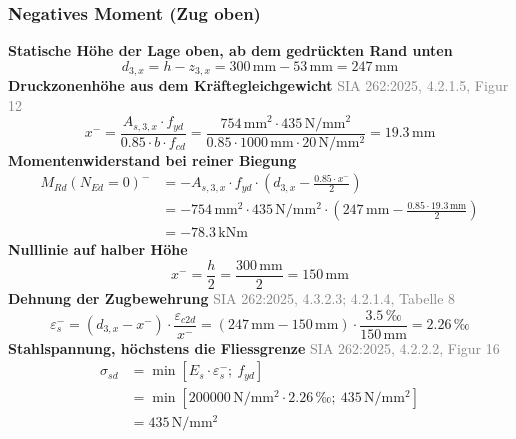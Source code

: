 \documentclass[11pt,a4paper]{article}
\newcommand{\normref}[1]{{\small\textcolor{gray}{#1}}}
\begin{document}
\subsubsection{Negatives Moment (Zug oben)}
\noindent\textbf{Statische Höhe der Lage oben, ab dem gedrückten Rand unten}
\begin{equation*}
d_{3,x} = h - z_{3,x} = 300\,\mathrm{mm} - 53\,\mathrm{mm} = 247\,\mathrm{mm}
\end{equation*}
\noindent\textbf{Druckzonenhöhe aus dem Kräftegleichgewicht} \hfill \normref{SIA 262:2025, 4.2.1.5, Figur 12}
\begin{equation*}
x^{-} = \frac{A_{s,3,x} \cdot f_{yd}}{0.85 \cdot b \cdot f_{cd}} = \frac{754\,\mathrm{mm}^{2} \cdot 435\,\mathrm{N}/\mathrm{mm}^{2}}{0.85 \cdot 1000\,\mathrm{mm} \cdot 20\,\mathrm{N}/\mathrm{mm}^{2}} = 19.3\,\mathrm{mm}
\end{equation*}
\noindent\textbf{Momentenwiderstand bei reiner Biegung}
\begin{equation*}
\begin{aligned}
  M_{Rd}(N_{Ed}=0)^{-} &= -A_{s,3,x} \cdot f_{yd} \cdot \left(d_{3,x} - \frac{0.85 \cdot x^{-}}{2}\right) \\
  &= -754\,\mathrm{mm}^{2} \cdot 435\,\mathrm{N}/\mathrm{mm}^{2} \cdot \left(247\,\mathrm{mm} - \frac{0.85 \cdot 19.3\,\mathrm{mm}}{2}\right) \\
  &= -78.3\,\mathrm{kNm}
\end{aligned}
\end{equation*}
\noindent\textbf{Nulllinie auf halber Höhe}
\begin{equation*}
x^{-} = \frac{h}{2} = \frac{300\,\mathrm{mm}}{2} = 150\,\mathrm{mm}
\end{equation*}
\noindent\textbf{Dehnung der Zugbewehrung} \hfill \normref{SIA 262:2025, 4.3.2.3; 4.2.1.4, Tabelle 8}
\begin{equation*}
\varepsilon_s^{-} = \left(d_{3,x} - x^{-}\right) \cdot \frac{\varepsilon_{c2d}}{x^{-}} = \left(247\,\mathrm{mm} - 150\,\mathrm{mm}\right) \cdot \frac{3.5\,\text{‰}}{150\,\mathrm{mm}} = 2.26\,\text{‰}
\end{equation*}
\noindent\textbf{Stahlspannung, höchstens die Fliessgrenze} \hfill \normref{SIA 262:2025, 4.2.2.2, Figur 16}
\begin{equation*}
\begin{aligned}
  \sigma_{sd} &= \min\left[E_s \cdot \varepsilon_s^{-};\ f_{yd}\right] \\
  &= \min\left[200000\,\mathrm{N}/\mathrm{mm}^{2} \cdot 2.26\,\text{‰};\ 435\,\mathrm{N}/\mathrm{mm}^{2}\right] \\
  &= 435\,\mathrm{N}/\mathrm{mm}^{2}
\end{aligned}
\end{equation*}
\end{document}
